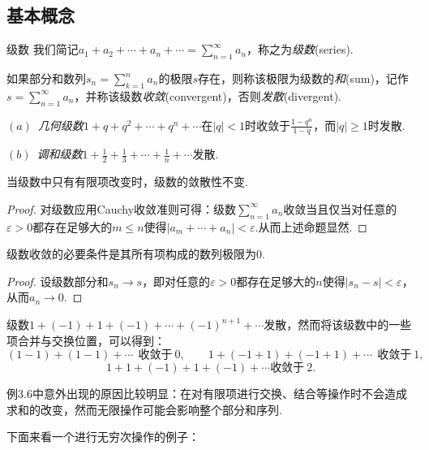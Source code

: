 \subsection{基本概念}

\begin{definition}{级数}
	我们简记$a_1+a_2+\cdots +a_n + \cdots = \sum_{n=1}^{\infty} a_n$，称之为\textit{级数}(series).
	
	如果部分和数列$s_n=\sum_{k=1}^n a_n$的极限$s$存在，则称该极限为级数的\textit{和}(sum)，记作$s=\sum_{n=1}^{\infty} a_n$，并称该级数\textit{收敛}(convergent)，否则\textit{发散}(divergent).
\end{definition}

\begin{example}
	$(a)$~\textit{几何级数}$1+q+q^2+\cdots +q^n+\cdots$在$|q|<1$时收敛于$\frac{1-q^n}{1-q}$，而$|q|\geq 1$时发散.
	
	$(b)$~\textit{调和级数}$1+\frac{1}{2}+\frac{1}{3}+\cdots + \frac{1}{n} + \cdots$发散.
\end{example}

\begin{proposition}{}
	当级数中只有有限项改变时，级数的敛散性不变.
\end{proposition}
\begin{proof}
	对级数应用Cauchy收敛准则可得：级数$\sum_{n=1}^{\infty} a_n$收敛当且仅当对任意的$\varepsilon >0$都存在足够大的$m \leq n$使得$|a_m + \cdots + a_n|<\varepsilon$.从而上述命题显然.
\end{proof}

\begin{proposition}{}
	级数收敛的必要条件是其所有项构成的数列极限为$0$.
\end{proposition}
\begin{proof}
	设级数部分和$s_n \to s$，即对任意的$\varepsilon >0$都存在足够大的$n$使得$|s_n-s|<\varepsilon$，从而$a_n \to 0$.
\end{proof}

\begin{example}
	级数$1+(-1)+1+(-1)+\cdots +(-1)^{n+1}+\cdots$发散，然而将该级数中的一些项合并与交换位置，可以得到：
	$$(1-1)+(1-1)+\cdots ~~\textit{收敛于}~0, \qquad 1+(-1+1)+(-1+1)+\cdots ~~\textit{收敛于}~1,$$
	$$1+1+(-1)+1+(-1)+\cdots \textit{收敛于}~2.$$
\end{example}

例3.6中意外出现的原因比较明显：在对有限项进行交换、结合等操作时不会造成求和的改变，然而无限操作可能会影响整个部分和序列.

下面来看一个进行无穷次操作的例子：

